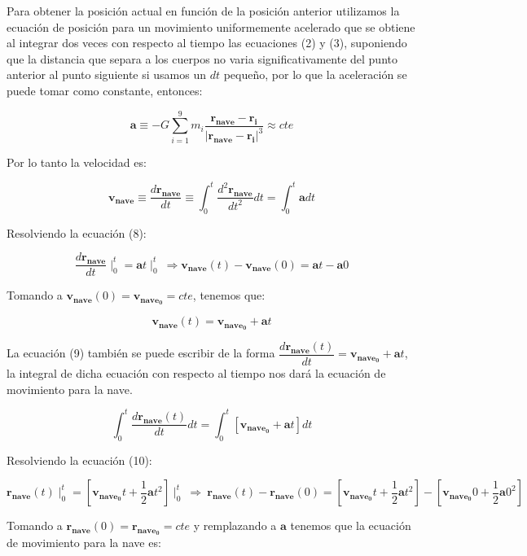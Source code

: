 \documentclass[12pt,letterpaper]{article}
\begin{document}
Para obtener la posición actual en función de la posición anterior utilizamos la ecuación de posición para un movimiento uniformemente acelerado que se obtiene al integrar dos veces con respecto al tiempo las ecuaciones (2) y (3), suponiendo que la distancia que separa a los cuerpos no varia significativamente del punto anterior al punto siguiente si usamos un $dt$ pequeño, por lo que la aceleración se puede tomar como constante, entonces:

\[
\mathbf{a} \equiv -G \sum_{i=1}^{9} m_ i\dfrac{\mathbf{r_{nave}}-\mathbf{r_i}}{|\mathbf{r_{nave}}-\mathbf{r_i}|^3} \approx cte
\]

Por lo tanto la velocidad es:

\begin{equation}
\mathbf{v_{nave}}\equiv \dfrac{d  \mathbf{r_{nave}}}{d t} \equiv \int_{0}^{t} \dfrac{d ^2 \mathbf{r_{nave}}}{d t^2} dt= \int_{0}^{t} \mathbf{a} dt
\end{equation}

Resolviendo la ecuación (8):

\[
\dfrac{d  \mathbf{r_{nave}}}{d t} \mid_{0}^{t}= \mathbf{a}t \mid_{0}^{t} \ \Rightarrow \mathbf{v_{nave}}(t)-\mathbf{v_{nave}}(0) = \mathbf{a}t - \mathbf{a}0
\]

Tomando a $\mathbf{v_{nave}}(0)=\mathbf{v_{nave_0}}=cte$, tenemos que:

\begin{equation}
\mathbf{v_{nave}}(t)=\mathbf{v_{nave_0}} + \mathbf{a}t
\end{equation}

La ecuación (9) también se puede escribir de la forma $\dfrac{d  \mathbf{r_{nave}}(t)}{d t}=\mathbf{v_{nave_0}} + \mathbf{a}t$, la integral de dicha ecuación con respecto al tiempo nos dará la ecuación de movimiento para la nave.

\begin{equation}
 \int_{0}^{t} \dfrac{d  \mathbf{r_{nave}}(t)}{d t} dt= \int_{0}^{t} [\mathbf{v_{nave_0}} + \mathbf{a}t] dt
\end{equation}

Resolviendo la ecuación (10):

\[
\mathbf{r_{nave}}(t) \mid_{0}^{t} = [\mathbf{v_{nave_0}}t + \dfrac{1}{2}\mathbf{a}t^2] \mid_{0}^{t} \ \Rightarrow \ 
\mathbf{r_{nave}}(t) - \mathbf{r_{nave}}(0) = [\mathbf{v_{nave_0}}t + \dfrac{1}{2}\mathbf{a}t^2] - [\mathbf{v_{nave_0}}0 + \dfrac{1}{2}\mathbf{a}0^2]
\]

Tomando a $\mathbf{r_{nave}}(0)=\mathbf{r_{nave_0}}=cte$ y remplazando a $\mathbf{a}$ tenemos que la ecuación de movimiento para la nave es:
\end{document}
